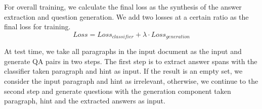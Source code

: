 For overall training, we calculate the final loss as the synthesis of the answer extraction and question generation. We add two losses at a certain ratio as the final loss for training.
\begin{equation}
    Loss = Loss_{classifier} + \lambda \cdot Loss_{generation}
\end{equation}


At test time, we take all paragraphs in the input document as the input and generate QA pairs in two steps. The first step is to extract answer spans with the classifier taken paragraph and hint as input. If the result is an empty set, we consider the input paragraph and hint as irrelevant, otherwise, we continue to the second step and generate questions with the generation component taken paragraph, hint and the extracted answers as input.